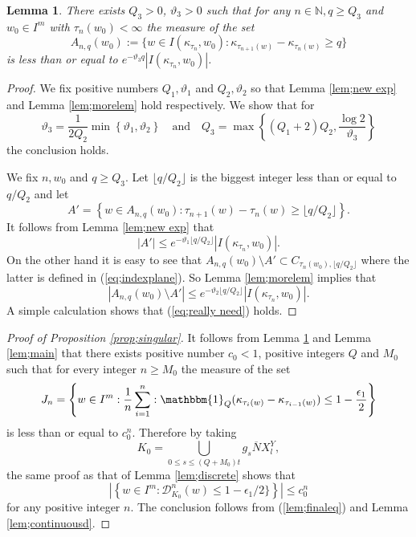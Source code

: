 \documentclass[12pt]{amsart}
\newtheorem{lem}[thm]{Lemma}
\theoremstyle{definition}
\theoremstyle{remark}
\numberwithin{equation}{section}
\begin{document}
\begin{lem}\label{lem;combine}
There exists   $Q_3>0$,  $\vartheta_3>0 $  such that for any $n\in \mathbb N, q\ge Q_3$ and $w_0\in I^m$ with $\tau_n(w_0)<\infty$
the measure of the  set 
\begin{equation}\label{eq;really need}
A_{n,q}(w_0):=\{w\in I(\kappa_{\tau_n},w_0): \kappa_{\tau_{n+1}(w)}-\kappa_{\tau_n(w)}\ge q\}
\end{equation}
 is less than or equal to 
$ e^{-\vartheta_3 q}|I(\kappa_{\tau_n},w_0)|$.
\end{lem}
\begin{proof}
We fix positive numbers  $Q_1,\vartheta_1$ and $Q_2, \vartheta_2$ so that Lemma \ref{lem;new exp}
and Lemma \ref{lem;morelem} hold respectively. 
We show that for 
\[
\vartheta_3=\frac{1}{2Q_2}\min 
\left \{{\vartheta_1}, {\vartheta_2}\right \}
\quad \mbox{and} \quad Q_3=\max\left\{(Q_1+2)Q_2 , \frac{\log 2}{\vartheta_3}
\right\}
\]
the conclusion holds. 

We fix $n, w_0$ and $q\ge Q_3$. Let  ${\lfloor q/Q_2\rfloor}$  is the biggest  integer less  than or equal to $q/Q_2$
 and let 
\[
A'=\left\{w\in A_{n,q}(w_0):\tau_{n+1}(w)-\tau_n(w)\ge\lfloor {q}/{Q_2} 
\rfloor\right\}.
\]
It follows from Lemma \ref{lem;new exp} that
\[
 |A'|\le e^ { {-\vartheta_1}{\lfloor q/Q_2\rfloor} }| I(\kappa_{\tau_n},w_0)|. 
 \]
 On the other hand 
 it is easy to see that  $ A_{n,q}(w_0)\setminus A'\subset C_{\tau_n(w_0), {\lfloor q/Q_2\rfloor} }$
 where the latter is defined in (\ref{eq;indexplane}).
 So Lemma \ref{lem;morelem} implies that 
 \[
 |A_{n,q}(w_0)\setminus A'|\le e^ {{-\vartheta_2}{\lfloor q/Q_2 \rfloor}}| I(\kappa_{\tau_n},w_0)|.
 \]
A simple calculation shows that  (\ref{eq;really need}) holds.
\end{proof}

\begin{proof}[Proof of Proposition \ref{prop;singular}]
It follows from Lemma \ref{lem;combine}  and Lemma \ref{lem;main} that there exists positive number
 $c_0<1$, positive  integers $Q$ and $ M_0$ such that for every integer $n\ge M_0$
the measure of the set 
\[
J_n=
\left \{w\in I^m: \frac{1}{n} \sum_{i=1}^n: \mathbbm{1}_Q
(\kappa_{\tau_i(w)}-\kappa_{\tau_{i-1}(w)})\le 1-\frac{\epsilon_1}{2}
\right \}
\]
is less than or equal to $c_0^n$. 
Therefore by taking 
\[
K_0=\bigcup_{0\le s\le (Q+M_0)t}g_s\overline N X_l^Y,
\]
the same proof as  that of Lemma \ref{lem;discrete} shows that 
\begin{equation}\label{lem;finaleq}
\left| \left\{
w\in I^m:\mathcal D_{K_0}^n(w)\le 1-\epsilon_1/2\}
\right\}
\right|\le c_0^n
\end{equation}
for any positive integer $n$.
The conclusion follows from 
 (\ref{lem;finaleq}) and Lemma \ref{lem;continuousd}.
\end{proof}
\end{document}
